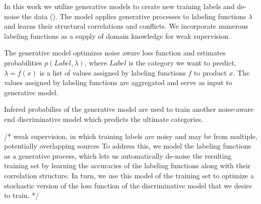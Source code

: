 
In this work we utilize generative models to create new training labels and de-noise the data (\cite{genmodels}).
The model applies generative processes to labeling functions $\lambda$ and learns their structural correlations and conflicts.
We incorporate numerous labeling functions as a supply of domain knowledge for weak supervision.

The generative model optimizes noise aware loss function and estimates probabilities $p(Label, \lambda)$,
where $Label$ is the category we want to predict, $\lambda = f(x)$ is a list of values assigned by labeling
functions $f$ to product $x$. The values assigned by labeling functions are aggregated and serve as input to
generative model.

Infered probabilies of the generative model are used to train another noise-aware end discriminative model which
predicts the ultimate categories.


/*
weak supervision, in which training labels are noisy and may be from
multiple, potentially overlapping sources
To address this, we model the labeling functions as a generative
process, which lets us automatically de-noise the resulting training set by learning the accuracies of
the labeling functions along with their correlation structure. In turn, we use this model of the training
set to optimize a stochastic version of the loss function of the discriminative model that we desire to train.
*/